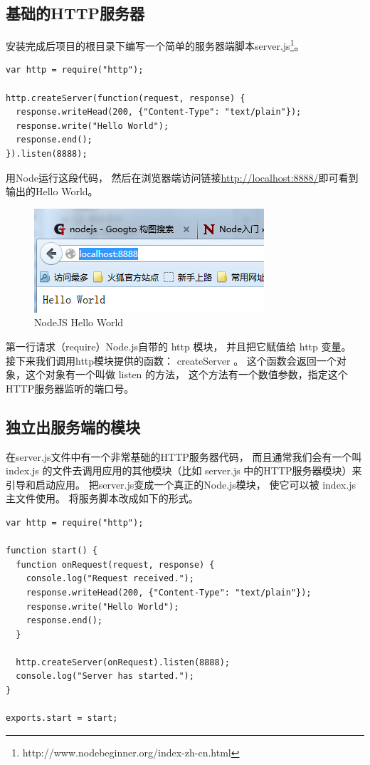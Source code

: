 \documentclass{book}
\begin{document}
\subsection{基础的HTTP服务器}

安装完成后项目的根目录下编写一个简单的服务器端脚本server.js\footnote{http://www.nodebeginner.org/index-zh-cn.html}。

\begin{lstlisting}[language=VBScript]
var http = require("http");

http.createServer(function(request, response) {
  response.writeHead(200, {"Content-Type": "text/plain"});
  response.write("Hello World");
  response.end();
}).listen(8888);
\end{lstlisting}

用Node运行这段代码，
然后在浏览器端访问链接\url{http://localhost:8888/}即可看到输出的Hello World。

\begin{figure}[htbp]
	\centering
	\includegraphics[scale=1]{NodeJSFirstHelloWorld.jpg}
	\caption{NodeJS Hello World}
	\label{fig:NodeJSFirstHelloWorld}
\end{figure}

第一行请求（require）Node.js自带的 http 模块，
并且把它赋值给 http 变量。
接下来我们调用http模块提供的函数： createServer 。
这个函数会返回一个对象，这个对象有一个叫做 listen 的方法，
这个方法有一个数值参数，指定这个HTTP服务器监听的端口号。

\subsection{独立出服务端的模块}

在server.js文件中有一个非常基础的HTTP服务器代码，
而且通常我们会有一个叫 index.js 
的文件去调用应用的其他模块（比如 server.js 中的HTTP服务器模块）来引导和启动应用。
把server.js变成一个真正的Node.js模块，
使它可以被 index.js 主文件使用。
将服务脚本改成如下的形式。

\begin{lstlisting}[language=VBScript]
var http = require("http");

function start() {
  function onRequest(request, response) {
    console.log("Request received.");
    response.writeHead(200, {"Content-Type": "text/plain"});
    response.write("Hello World");
    response.end();
  }

  http.createServer(onRequest).listen(8888);
  console.log("Server has started.");
}

exports.start = start;
\end{lstlisting}
\end{document}
